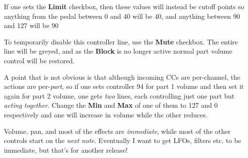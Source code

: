    If one sets the \textbf{Limit} checkbox, then these values will instead be
   cutoff points so anything from the pedal between 0 and 40 will be 40, and
   anything between 90 and 127 will be 90

   To temporarily disable this controller line, use the \textbf{Mute} checkbox.
   The entire line will be greyed, and as the \textbf{Block} is no longer
   active normal part volume control will be restored.

   A point that is not obvious is that although incoming CCs are per-channel,
   the actions are per-\textsl{part}, so if one sets controller 94 for part 1
   volume and then set it again for part 2 volume, one gets \textsl{two} lines,
   each controlling just one part but \textsl{acting together}.  Change the
   \textbf{Min} and \textbf{Max} of one of them to 127 and 0 respectively and
   one will increase in volume while the other reduces.

   Volume, pan, and most of the effects are \textsl{immediate}, while most of
   the other controls start on the \textsl{next note}.  Eventually I want to
   get LFOs, filters etc. to be immediate, but that's for another release!

